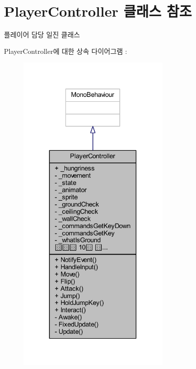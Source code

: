 \hypertarget{class_player_controller}{}\section{Player\+Controller 클래스 참조}
\label{class_player_controller}


플레이어 담당 일진 클래스  




Player\+Controller에 대한 상속 다이어그램 \+: 
\nopagebreak
\begin{figure}[H]
\begin{center}
\leavevmode
\includegraphics[width=213pt]{d1/dc2/class_player_controller__inherit__graph}
\end{center}
\end{figure}


